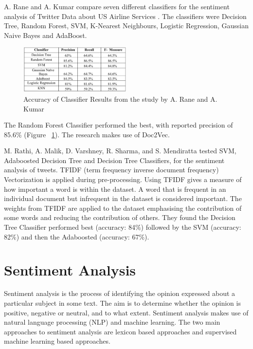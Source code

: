 A. Rane and A. Kumar compare seven different classifiers for the sentiment analysis of Twitter Data about US Airline Services \cite{Rane2018}. The classifiers were Decision Tree, Random Forest, SVM, K-Nearest Neighbours, Logistic Regression, Gaussian Naive Bayes and AdaBoost.
\begin{figure}
    \centering
    \setlength{\belowcaptionskip}{-10pt}
    \includegraphics[width=0.5\textwidth]{literature_review/arane_classifier_results.PNG}
    \caption{Accuracy of Classifier Results from the study by A. Rane and A. Kumar \cite{Rane2018}}
    \label{fig:arane}
\end{figure}
 The Random Forest Classifier performed the best, with reported precision of 85.6\% (Figure ~\ref{fig:arane}). The research makes use of Doc2Vec.

M. Rathi, A. Malik, D. Varshney, R. Sharma, and S. Mendiratta \cite{Raithi2018} tested SVM, Adaboosted Decision Tree and Decision Tree Classifiers, for the sentiment analysis of tweets. TFIDF (term frequency inverse document frequency) Vectorization is applied during pre-processing. Using TFIDF gives a measure of how important a word is within the dataset. A word that is frequent in an individual document but infrequent in the dataset is considered important. The weights from TFIDF are applied to the dataset emphasising the contribution of some words and reducing the contribution of others. They found the Decision Tree Classifier performed best  (accuracy: 84\%) followed by the SVM (accuracy: 82\%) and then the Adaboosted (accuracy: 67\%). 

\section{Sentiment Analysis}

Sentiment analysis is the process of identifying the opinion expressed about a particular subject in some text. The aim is to determine whether the opinion is positive, negative or neutral, and to what extent. Sentiment analysis makes use of natural language processing (NLP) and machine learning. The two main approaches to sentiment analysis are lexicon based approaches and supervised machine learning based approaches. 

